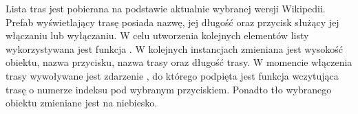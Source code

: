 Lista tras jest pobierana na podstawie aktualnie wybranej wersji Wikipedii. Prefab wyświetlający trasę posiada nazwę, jej długość oraz przycisk służący jej włączaniu lub wyłączaniu. W celu utworzenia kolejnych elementów listy wykorzystywana jest funkcja . W kolejnych instancjach zmieniana jest wysokość obiektu, nazwa przycisku, nazwa trasy oraz długość trasy. W momencie włączenia trasy wywoływane jest zdarzenie , do którego podpięta jest funkcja  wczytująca trasę o numerze indeksu pod wybranym przyciskiem. Ponadto tło wybranego obiektu zmieniane jest na niebiesko.
